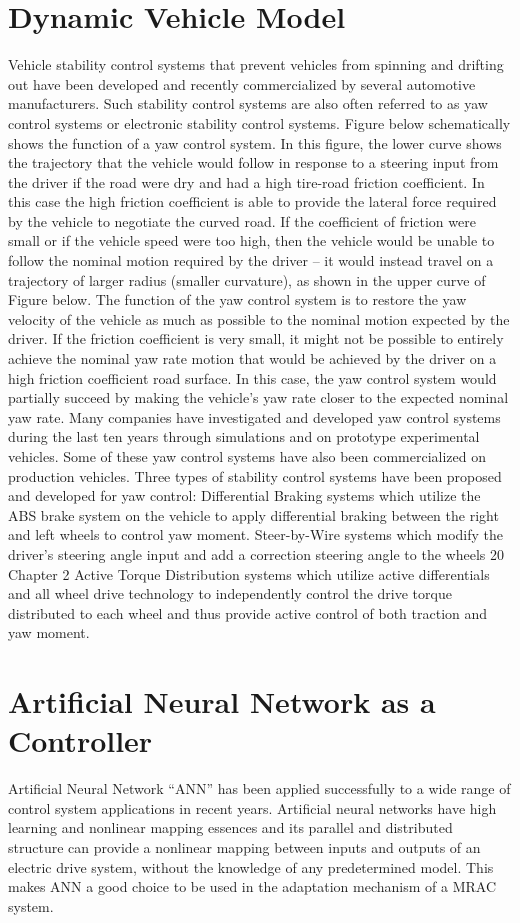 \documentclass[a4paper, 12pt]{article}
\begin{document}
\section{Dynamic Vehicle Model}
Vehicle stability control systems that prevent vehicles from spinning and
drifting out have been developed and recently commercialized by several
automotive manufacturers. Such stability control systems are also often
referred to as yaw control systems or electronic stability control systems.
Figure below schematically shows the function of a yaw control system.
In this figure, the lower curve shows the trajectory that the vehicle would
follow in response to a steering input from the driver if the road were dry
and had a high tire-road friction coefficient. In this case the high friction
coefficient is able to provide the lateral force required by the vehicle to
negotiate the curved road. If the coefficient of friction were small or if the vehicle speed were too high, then the vehicle would be unable to follow
the nominal motion required by the driver – it would instead travel on a
trajectory of larger radius (smaller curvature), as shown in the upper curve of Figure below. The function of the yaw control system is to restore the yaw
velocity of the vehicle as much as possible to the nominal motion expected
by the driver. If the friction coefficient is very small, it might not be possible to entirely achieve the nominal yaw rate motion that would be achieved by the driver on a high friction coefficient road surface. In this case, the yaw control system would partially succeed by making the vehicle’s yaw rate closer to the expected nominal yaw rate.
Many companies have investigated and developed yaw control systems
during the last ten years through simulations and on prototype experimental
vehicles. Some of these yaw control systems have also been commercialized
on production vehicles.
Three types of stability control systems have been proposed and developed
for yaw control:
Differential Braking systems which utilize the ABS brake system on the
vehicle to apply differential braking between the right and left wheels to
control yaw moment.
Steer-by-Wire systems which modify the driver’s steering angle input
and add a correction steering angle to the wheels
20 Chapter 2
Active Torque Distribution systems which utilize active differentials
and all wheel drive technology to independently control the drive torque
distributed to each wheel and thus provide active control of both traction and yaw moment.
\section{Artificial Neural Network as a Controller}
Artificial Neural Network “ANN” has been applied successfully to a wide range of control system applications in recent years. Artificial neural networks have high learning and nonlinear mapping essences and its parallel and distributed structure can provide a nonlinear mapping between inputs and outputs of an electric drive system, without the knowledge of any predetermined model. This makes ANN a good choice to be used in the adaptation mechanism of a MRAC system.
\end{document}

